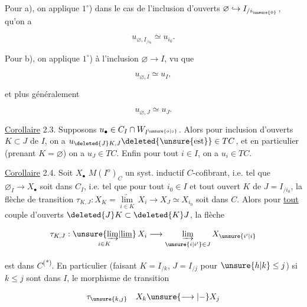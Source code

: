
Pour a), on applique $1^\circ$)  dans le cas de l'inclusion d'ouverts $\varnothing\hookrightarrow I_{/i_{\unsure{0}}}$,  qu'on a

\[
 u_{\varnothing,I_{/i_0}}\simeq u_{i_0}.
\]

Pour b), on applique $1^\circ$) à l'inclusion $\varnothing\longrightarrow I$, vu que

\[
 u_{\varnothing,I}\simeq u_I,
\]

et plus généralement

\[
 u_{\varnothing,J}\simeq u_J.
\]

\uline{Corollaire} 2.3. Supposons $u_\bullet\in C_I\cap W_{I^{\unsure{o|\circ}}}$. Alors  pour   inclusion d'ouverts $K\subset J$ de $I$, on a $u_{\deleted{J}K,J}\deleted{\unsure{\text{est}}}\in TC$, et en particulier  (prenant $K=\varnothing$) on a $u_J\in TC$. Enfin pour tout $i\in I$, on a $u_i\in TC$.

\uline{Corollaire} 2.4.  Soit $X_\bullet$  $M(I^o)_C$ un syst. inductif $C$-cofibrant, i.e. tel que $\varnothing_I\longrightarrow X_\bullet$ soit dans $C_I$, i.e. tel que  pour tout $i_0\in I$ et tout ouvert $K$ de $J=I_{/i_0}$, la flèche de transition $\tau_{K,J}:X_K=\underset{i\in K}{\underrightarrow{\lim}}\,X_i\longrightarrow X_J\simeq X_{i_0}$ soit dans $C$. Alors pour \uline{tout} couple d'ouverts $\deleted{J}K\subset\deleted{K}J$, la flèche 

\[
 \tau_{K,J}:\underset{i\in K}{\unsure{\underrightarrow{\lim}|\underline{\lim}}}\,X_i
 \longrightarrow\underset{\unsure{i|i'}\in J}{\underrightarrow{\lim}}\,X_{\unsure{i'|i}}
\]

est dans $C$\textsuperscript{(*)}. 
En particulier (faisant $K=I_{/k}$, $J=I_{/j}$ pour $\unsure{h|k}\le j$) si $k\le j$ sont dans $I$, le morphisme de transition

\[
 \tau_{\unsure{k,j}}\quad X_k\unsure{\longrightarrow|-}X_j
\]


